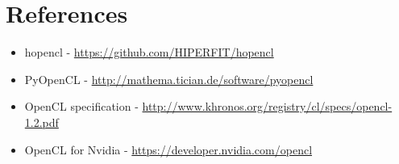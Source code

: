 \documentclass[a4paper, 10pt]{article}
\begin{document}
\section{References}

\begin{itemize}
  \item hopencl - \url{https://github.com/HIPERFIT/hopencl} \\
  \item PyOpenCL - \url{http://mathema.tician.de/software/pyopencl} \\
  \item OpenCL specification -
    \url{http://www.khronos.org/registry/cl/specs/opencl-1.2.pdf} \\
  \item OpenCL for Nvidia - \url{https://developer.nvidia.com/opencl}
    \\
\end{itemize}
\end{document}

